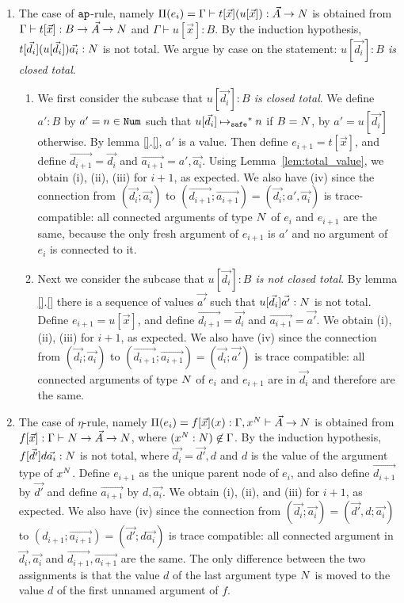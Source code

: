 \documentclass{article}
\newenvironment{proof}[1][Proof]{\begin{trivlist}
\item[\hskip \labelsep {\bfseries #1}]}{\end{trivlist}}
\begin{document}
\begin{proof}
\begin{enumerate}
\item
  The case of ${\tt ap}$-rule, namely 
  $\Pi(e_i) = \Gamma\vdash t[\vec{x}](u[\vec{x}]): \vec{A}\rightarrow{N}$ is obtained from
  $\Gamma\vdash t[\vec{x}]: B \rightarrow \vec{A}\rightarrow{N}$ 
  and $\Gamma\vdash u[\vec{x}]: B$.
  By the induction hypothesis, $t[\vec{d_i}](u[\vec{d_i}])\vec{a_i}:{N}$ is not total.
  We argue by case on the statement: \emph{$u[\vec{d_i}]:B$ is closed total}.

\begin{enumerate}
\item
  We first consider the subcase that \emph{$u[\vec{d_i}]:B$ is closed total}.
  We define $a':B$ by $a' = n\in{\tt Num}$ such that $u[\vec{d_i}] \mathbin{\mathbin{\mapsto}_{\hbox{\scriptsize \tt safe}}}^* n$ if $B={N}$,
  by $a' = u[\vec{d_i}]$ otherwise. By lemma \ref{}.\ref{}, $a'$ is a value.
  Then define $e_{i+1}=t[\vec{x}]$,
  and define $\vec{d_{i+1}} = \vec{d_i}$ and $\vec{a_{i+1}} = a',\vec{a_i}$. 
  Using Lemma~\ref{lem:total_value}, we obtain (i), (ii), (iii) for $i+1$, as expected. 
  We also have (iv) since the connection from 
  $(\vec{d_i};\vec{a_i})$ to $(\vec{d_{i+1}};\vec{a_{i+1}}) = (\vec{d_i};a',\vec{a_i})$ is
  trace-compatible: all connected arguments of type ${N}$ of $e_{i}$ and $e_{i+1}$ are the same,
  because the only fresh argument of $e_{i+1}$ is $a'$ and no argument of $e_i$ is connected to it.
\item
  Next we consider the subcase that \emph{$u[\vec{d_i}]:B$ is not closed total}.
  By lemma \ref{}.\ref{}
  there is a sequence of values $\vec{a'}$ such that $u[\vec{d_i}]\vec{a'}:{N}$ is not total.
  Define $e_{i+1}=u[\vec{x}]$,
  and define $\vec{d_{i+1}} = \vec{d_i}$ and $\vec{a_{i+1}} = \vec{a'}$. 
  We obtain (i), (ii), (iii) for $i+1$, as expected.
  We also have (iv) since the connection from 
  $(\vec{d_i};\vec{a_i})$ to $(\vec{d_{i+1}};\vec{a_{i+1}}) = (\vec{d_i};\vec{a'})$ is
  trace compatible: all connected arguments of type ${N}$ of $e_{i}$ and $e_{i+1}$ are 
  in $\vec{d_i}$ and therefore are the same.
 \end{enumerate}

\item
  The case of $\eta$-rule, namely 
  $\Pi(e_i) = f[\vec{x}](x): \Gamma,x^{N}\vdash \vec{A}\rightarrow{N}$ is obtained from
  $f[\vec{x}]:\Gamma\vdash N\rightarrow \vec{A} \rightarrow {N}$, where
  $(x^{N}:{N})\not\in\Gamma$.
  By the induction hypothesis, $f[\vec{d'}]d\vec{a_i}:{N}$ is not total,
  where $\vec{d_i} = \vec{d'},d$ and $d$ is the value of the argument type of $x^{N}$.
  Define $e_{i+1}$ as the unique parent node of $e_i$, and
  also define $\vec{d_{i+1}}$ by $\vec{d'}$ and define $\vec{a_{i+1}}$ by $d,\vec{a_i}$. 
  We obtain (i), (ii), and (iii) for $i+1$, as expected.
  We also have (iv) since the connection from
  $(\vec{d_i};\vec{a_i}) = (\vec{d'},d;\vec{a_i})$ to
  $(d_{i+1};\vec{a_{i+1}}) = (\vec{d'};d\vec{a_i})$
  is trace compatible: all connected argument in $\vec{d_{i}},\vec{a_{i}}$ and 
  $\vec{d_{i+1}},\vec{a_{i+1}}$ are the same. The only difference between the two assignments
  is that the value $d$ of the last argument type ${N}$ is moved to the value $d$ 
  of the first unnamed argument of $f$. 


\end{enumerate}
\end{proof}
\end{document}
